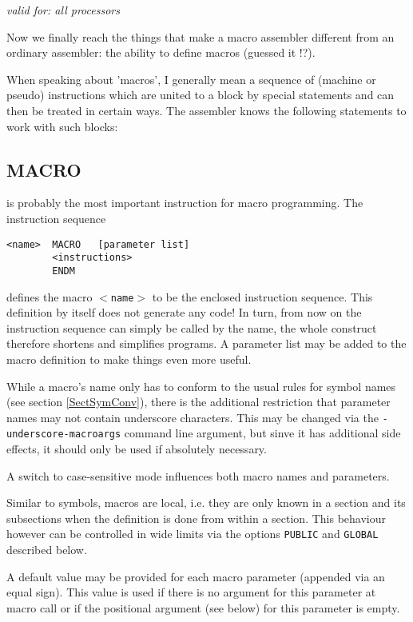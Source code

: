 \documentclass[12pt,twoside]{report}
\makeatletter
\newcommand{\tty}[1]{{\tt #1}}
\newcommand{\ttindex}[1]{\index{#1@{\tt #1}}}
\makeatother
\begin{document}
{\em valid for: all processors}

Now we finally reach the things that make a macro assembler different
from an ordinary assembler: the ability to define macros (guessed
it !?).

When speaking about 'macros', I generally mean a sequence of (machine
or pseudo) instructions which are united to a block by special
statements and can then be treated in certain ways.  The assembler
knows the following statements to work with such blocks:


\subsection{MACRO}
\ttindex{MACRO}\ttindex{ENDM}
\label{SectMacros}

is probably the most important instruction for macro programming.
The instruction sequence
\begin{verbatim}
<name>  MACRO   [parameter list]
        <instructions>
        ENDM
\end{verbatim}
defines the macro \tty{$<$name$>$} to be the enclosed instruction sequence.
This definition by itself does not generate any code!  In turn, from
now on the instruction sequence can simply be called by the name, the
whole construct therefore shortens and simplifies programs.  A
parameter list may be added to the macro definition to make things
even more useful.
\par
While a macro's name only has to conform to the usual rules for symbol
names (see section \ref{SectSymConv}), there is the additional restriction
that parameter names may not contain underscore characters.  This may
be changed via the \tty{-underscore-macroargs} command line argument,
but sinve it has additional side effects, it should only be used if
absolutely necessary.
\par
A switch to case-sensitive mode influences both macro names and
parameters.

Similar to symbols, macros are local, i.e. they are only known in a
section and its subsections when the definition is done from within
a section.  This behaviour however can be controlled in wide limits
via the options \tty{PUBLIC} and \tty{GLOBAL} described below.

A default value may be provided for each macro parameter
(appended via an equal sign).  This value is used if there is no
argument for this parameter at macro call or if the positional
argument (see below) for this parameter is empty.
\end{document}
